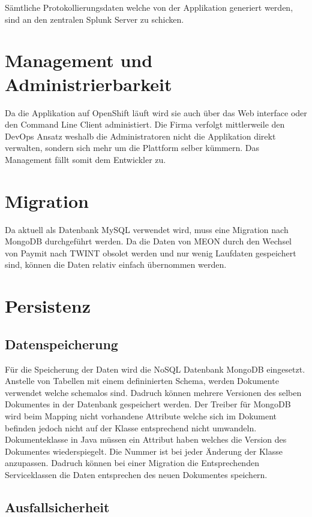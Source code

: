 Sämtliche Protokollierungsdaten welche von der Applikation generiert werden, sind an den zentralen Splunk Server zu schicken.

\section{Management und Administrierbarkeit}

Da die Applikation auf OpenShift läuft wird sie auch über das Web interface oder den Command Line Client administiert. Die Firma verfolgt mittlerweile den DevOps Ansatz weshalb die Administratoren nicht die Applikation direkt verwalten, sondern sich mehr um die Plattform selber kümmern.  Das Management fällt somit dem Entwickler zu. 

\section{Migration}

Da aktuell als Datenbank MySQL verwendet wird, muss eine Migration nach MongoDB durchgeführt werden. Da die Daten von MEON durch den Wechsel von Paymit nach TWINT
obsolet werden und nur wenig Laufdaten gespeichert sind, können die Daten relativ einfach übernommen werden.

\section{Persistenz}
\label{persistenz}

\subsection{Datenspeicherung}
Für die Speicherung der Daten wird die NoSQL Datenbank MongoDB eingesetzt. Anstelle von Tabellen mit einem defininierten Schema, werden Dokumente verwendet welche schemalos sind. Dadruch können mehrere Versionen des selben Dokumentes in der Datenbank gespeichert werden. Der Treiber für MongoDB wird beim Mapping nicht vorhandene Attribute welche sich im Dokument befinden jedoch nicht auf der Klasse entsprechend nicht umwandeln.\newline
Dokumenteklasse in Java müssen ein Attribut haben welches die Version des Dokumentes wiederspiegelt. Die Nummer ist bei jeder Änderung der Klasse anzupassen. Dadruch können bei einer Migration die Entsprechenden Serviceklassen die Daten entsprechen des neuen Dokumentes speichern.

\subsection{Ausfallsicherheit}

